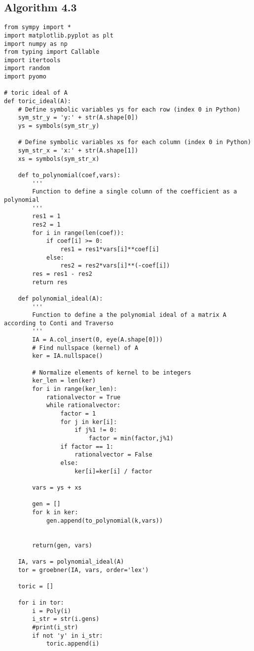 \documentclass{article}
\theoremstyle{plain}
\theoremstyle{definition}
\begin{document}
\begin{propsition}
\subsection{Algorithm 4.3}
\begin{verbatim}
from sympy import *
import matplotlib.pyplot as plt
import numpy as np
from typing import Callable
import itertools
import random
import pyomo

# toric ideal of A
def toric_ideal(A):
    # Define symbolic variables ys for each row (index 0 in Python)
    sym_str_y = 'y:' + str(A.shape[0])
    ys = symbols(sym_str_y)
    
    # Define symbolic variables xs for each column (index 0 in Python)
    sym_str_x = 'x:' + str(A.shape[1])
    xs = symbols(sym_str_x)

    def to_polynomial(coef,vars):
        '''
        Function to define a single column of the coefficient as a polynomial
        '''
        res1 = 1
        res2 = 1
        for i in range(len(coef)):
            if coef[i] >= 0:
                res1 = res1*vars[i]**coef[i]
            else:
                res2 = res2*vars[i]**(-coef[i])
        res = res1 - res2
        return res

    def polynomial_ideal(A):
        '''
        Function to define a the polynomial ideal of a matrix A according to Conti and Traverso
        '''
        IA = A.col_insert(0, eye(A.shape[0]))
        # Find nullspace (kernel) of A
        ker = IA.nullspace()

        # Normalize elements of kernel to be integers
        ker_len = len(ker)
        for i in range(ker_len):
            rationalvector = True
            while rationalvector:
                factor = 1
                for j in ker[i]:
                    if j%1 != 0:
                        factor = min(factor,j%1)
                if factor == 1:
                    rationalvector = False
                else:
                    ker[i]=ker[i] / factor

        vars = ys + xs

        gen = []
        for k in ker:
            gen.append(to_polynomial(k,vars))


        return(gen, vars)
    
    IA, vars = polynomial_ideal(A)
    tor = groebner(IA, vars, order='lex')

    toric = []

    for i in tor:
        i = Poly(i)
        i_str = str(i.gens)
        #print(i_str)
        if not 'y' in i_str:
            toric.append(i)


\end{verbatim}
\end{propsition}
\end{document}
